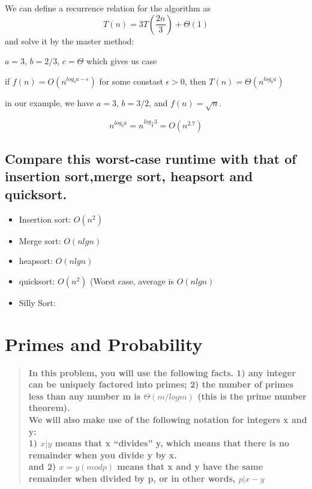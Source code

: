 \documentclass[titlepage]{article}\usepackage[]{graphicx}\usepackage[]{color}
\begin{document}
We can define a recurrence relation for the algorithm as 
\[ T(n) = 3T(\frac{2n}{3}) + \Theta(1) \]
and solve it by the master method:

$a = 3, \, b = 2/3, \, c=\Theta$ which gives us case 


%
%

	if $f(n) = O\left(n^{log_b a-\epsilon}\right)$ for some constast
		$\epsilon > 0$, then $T(n) = \Theta(n^{log_b a})$

in our example, we have $a = 3$, $b = 3/2$, and $f(n) = \sqrt{n}$. 

\[ n^{log_b a} = n^{log_\frac{3}{2} 3} = O(n^{2.7}) \]

  
\subsection{ Compare this worst-case runtime with that of insertion sort,merge
sort, heapsort and quicksort.}

\begin{itemize}
\item Insertion sort: $O(n^2)$
\item Merge sort: $O(nlgn)$
\item heapsort: $O(n lg n)$
\item quicksort: $O(n^2)$ (Worst case, average is $O(n lg n)$
\item Silly Sort: 
\end{itemize}


\section{Primes and Probability}

\begin{quote}
	\textbf{
In this problem, you will use the following facts. 1) any integer can be
uniquely factored into primes; 2) the number of primes less than any number m
is $\Theta(m/ log m)$ (this is the prime number theorem). \\
We will also make use of the following notation for integers x and y: \\
1) $x|y$ means that x ``divides'' y, which means that there is no remainder
when you divide y by x. \\ 
and 2) $ x = y(modp)$ means that x and y have the same remainder when
divided by p, or in other words, $p|x−y$} 
\end{quote}
\end{document}
